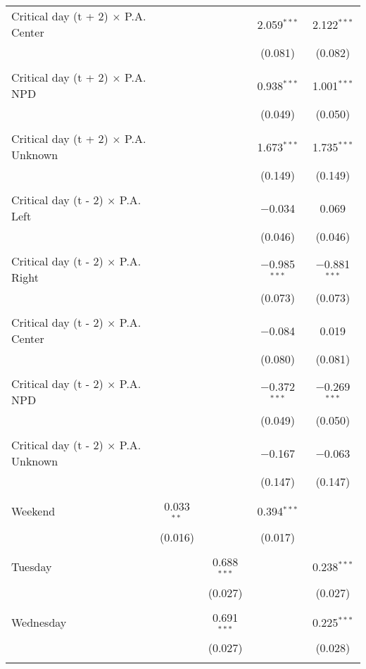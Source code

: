 \documentclass[
]{article}
\begin{document}
\begin{table}[!htbp]
{\begin{tabular}{@{\extracolsep{5pt}}lcccc}
 Critical day (t + 2) $\times$ P.A. Center &  &  & 2.059$^{***}$ & 2.122$^{***}$ \\ 
  &  &  & (0.081) & (0.082) \\ 
  & & & & \\ 
 Critical day (t + 2) $\times$ P.A. NPD &  &  & 0.938$^{***}$ & 1.001$^{***}$ \\ 
  &  &  & (0.049) & (0.050) \\ 
  & & & & \\ 
 Critical day (t + 2) $\times$ P.A. Unknown &  &  & 1.673$^{***}$ & 1.735$^{***}$ \\ 
  &  &  & (0.149) & (0.149) \\ 
  & & & & \\ 
 Critical day (t - 2) $\times$ P.A. Left &  &  & $-$0.034 & 0.069 \\ 
  &  &  & (0.046) & (0.046) \\ 
  & & & & \\ 
 Critical day (t - 2) $\times$ P.A. Right &  &  & $-$0.985$^{***}$ & $-$0.881$^{***}$ \\ 
  &  &  & (0.073) & (0.073) \\ 
  & & & & \\ 
 Critical day (t - 2) $\times$ P.A. Center &  &  & $-$0.084 & 0.019 \\ 
  &  &  & (0.080) & (0.081) \\ 
  & & & & \\ 
 Critical day (t - 2) $\times$ P.A. NPD &  &  & $-$0.372$^{***}$ & $-$0.269$^{***}$ \\ 
  &  &  & (0.049) & (0.050) \\ 
  & & & & \\ 
 Critical day (t - 2) $\times$ P.A. Unknown &  &  & $-$0.167 & $-$0.063 \\ 
  &  &  & (0.147) & (0.147) \\ 
  & & & & \\ 
 Weekend & 0.033$^{**}$ &  & 0.394$^{***}$ &  \\ 
  & (0.016) &  & (0.017) &  \\ 
  & & & & \\ 
 Tuesday &  & 0.688$^{***}$ &  & 0.238$^{***}$ \\ 
  &  & (0.027) &  & (0.027) \\ 
  & & & & \\ 
 Wednesday &  & 0.691$^{***}$ &  & 0.225$^{***}$ \\ 
  &  & (0.027) &  & (0.028) \\ 
  & & & & \\ 

\end{tabular}}
\end{table}
\end{document}

